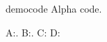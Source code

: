 \documentclass{article}
\begin{document}
\begin{filecontents*}[overwrite]{democode}
Alpha code.
\end{filecontents*}
A:.
B:.
C:
D:
\end{document}
